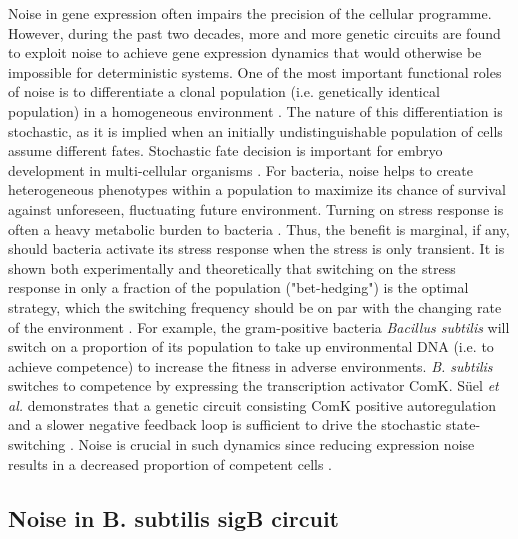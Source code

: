 Noise in gene expression often impairs the precision of the cellular
programme. However, during the past two decades, more and more genetic
circuits are found to exploit noise to achieve gene expression dynamics
that would otherwise be impossible for deterministic systems.
One of the most important functional roles of noise is to differentiate
a clonal population (i.e. genetically identical population) in a
homogeneous environment \cite{raj08,eldar10a}.
The nature of this differentiation is stochastic, as it is implied when
an initially undistinguishable population of cells 
assume different fates.
Stochastic fate decision is important for embryo development 
in multi-cellular organisms \cite{dietrich07}.
For bacteria, noise helps to create heterogeneous phenotypes within a
population to maximize its chance of survival against 
unforeseen, fluctuating future environment.
Turning on stress response is often a heavy metabolic burden to
bacteria \cite{schweder99}.
Thus, the benefit is marginal, if any, should bacteria activate its
stress response when the stress is only transient.
It is shown both experimentally and theoretically that 
switching on the stress response in only a fraction
of the population ("bet-hedging") is the optimal strategy,
which the switching frequency should be on par with
the changing rate of the environment \cite{acar08,kussell05}.
For example, the gram-positive bacteria \textit{Bacillus subtilis}
will switch on a proportion of its population to take up environmental
DNA (i.e. to achieve competence) to increase the fitness in
adverse environments.
\textit{B. subtilis} switches to competence by expressing the 
transcription activator ComK.
Süel \textit{et al.} demonstrates that a genetic circuit consisting
ComK positive autoregulation and a slower negative feedback loop
is sufficient to drive the stochastic state-switching \cite{suel06}.
Noise is crucial in such dynamics since reducing expression noise
results in a decreased proportion of competent cells 
\cite{maamar05,suel06}.

\subsection{Noise in B. subtilis sigB circuit}

